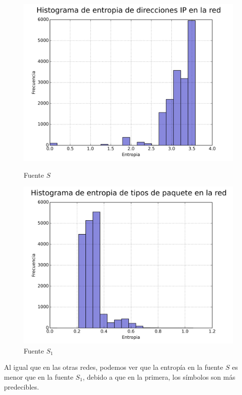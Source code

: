 \begin{figure}[ht!]
  \centering
  \begin{minipage}[b]{0.48\textwidth}
    \includegraphics[width=\textwidth]{graficos/galerias_pacifico3_10min_hist_arp.png}
    \caption{Fuente $S$}
    \label{fig:galerias_pacifico3_10min_hist_arp}
  \end{minipage}
  \hfill
  \begin{minipage}[b]{0.48\textwidth}
    \includegraphics[width=\textwidth]{graficos/galerias_pacifico3_10min_hist_type.png}
    \caption{Fuente $S_1$}
    \label{fig:red_domestica_hist_arp}
  \end{minipage}
\end{figure}

Al igual que en las otras redes, podemos ver que la entropía en la fuente $S$ es menor que en la fuente $S_1$, debido a que en la primera, los símbolos son más predecibles.